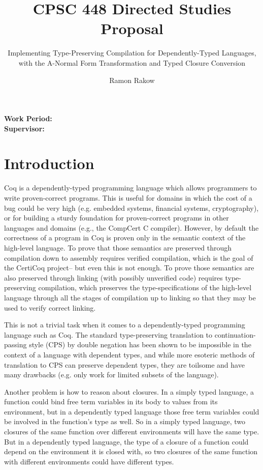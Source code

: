 \documentclass[manuscript]{acmart}
\begin{document}
\title{CPSC 448 Directed Studies Proposal}
\subtitle{Implementing Type-Preserving Compilation for Dependently-Typed Languages, with the A-Normal Form Transformation and Typed Closure Conversion}
\author{Ramon Rakow}
\maketitle

\textbf{Work Period:}
\\
\textbf{Supervisor:}

\section{Introduction}

Coq is a dependently-typed programming language which allows programmers to write proven-correct programs. This is useful for domains in which the cost of a bug could be very high (e.g. embedded systems, financial systems, cryptography), or for building a sturdy foundation for proven-correct programs in other languages and domains (e.g., the CompCert C compiler). However, by default the correctness of a program in Coq is proven only in the semantic context of the high-level language. To prove that those semantics are preserved through compilation down to assembly requires verified compilation, which is the goal of the CertiCoq project-- but even this is not enough. To prove those semantics are also preserved through linking (with possibly unverified code) requires type-preserving compilation, which preserves the type-specifications of the high-level language through all the stages of compilation up to linking so that they may be used to verify correct linking. 

This is not a trivial task when it comes to a dependently-typed programming language such as Coq. The standard type-preserving translation to continuation-passing style (CPS) by double negation has been shown to be impossible in the context of a language with dependent types, and while more esoteric methods of translation to CPS can preserve dependent types, they are toilsome and have many drawbacks (e.g. only work for limited subsets of the language). 

Another problem is how to reason about closures. In a simply typed language, a function could bind free term variables in its body to values from its environment, but in a dependently typed language those free term variables could be involved in the function's type as well. So in a simply typed language, two closures of the same function over different environments will have the same type. But in a dependently typed language, the type of a closure of a function could depend on the environment it is closed with, so two closures of the same function with different environments could have different types.
\end{document}
